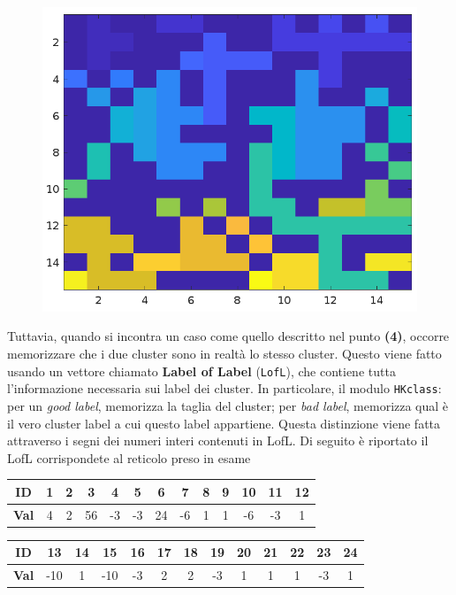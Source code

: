 \begin{figure}[H]
\begin{minipage}{0.45\textwidth}
		\includegraphics[width=\linewidth]{images/labels}
		\label{fig:basegrid}
	\end{minipage}
\end{figure}
\noindent
Tuttavia, quando si incontra un caso come quello descritto nel punto \textbf{(4)}, occorre  memorizzare che i due cluster sono in realtà lo stesso cluster. Questo viene fatto usando un vettore chiamato \textbf{Label of Label} (\texttt{LofL}), che contiene tutta l’informazione necessaria sui label dei cluster. In particolare, il modulo \texttt{HKclass}: 
per un \textit{good label}, memorizza la taglia del cluster; 
per \textit{bad label}, memorizza qual è il vero cluster label a cui questo label appartiene.  Questa distinzione viene fatta attraverso i segni dei numeri interi contenuti in LofL. Di seguito è riportato il LofL corrispondete al reticolo preso in esame

\vspace{15px}
\noindent
\begin{tabular}{|c|*{12}{c|}}
	\hline
	\textbf{ID}   & 1 & 2 & 3 & 4 & 5 & 6 & 7 & 8 & 9 & 10 & 11 & 12 \\
	\hline
	\textbf{Val}  & 4 & 2 & 56 & -3 & -3 & 24 & -6 & 1 & 1 & -6 & -3 & 1 \\
	\hline
\end{tabular}

\vspace{10px}
\noindent
\begin{tabular}{|c|*{12}{c|}}
	\hline
	\textbf{ID}   & 13 & 14 & 15 & 16 & 17 & 18 & 19 & 20 & 21 & 22 & 23 & 24 \\
	\hline
	\textbf{Val}  & -10 & 1 & -10 & -3 & 2 & 2 & -3 & 1 & 1 & 1 & -3 & 1 \\
	\hline
\end{tabular}


